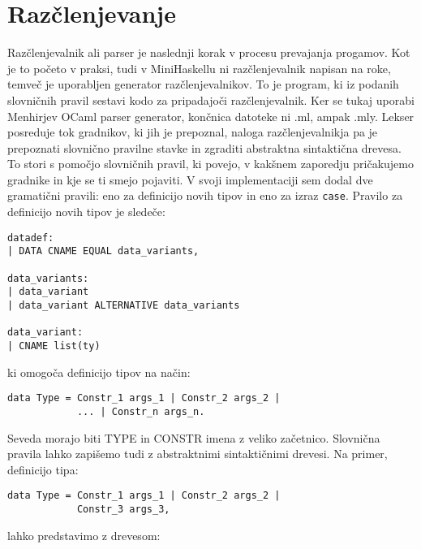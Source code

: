 \documentclass[12pt,a4paper,openany]{book}
\begin{document}
\section{Razčlenjevanje}
Razčlenjevalnik ali parser je naslednji korak v procesu prevajanja progamov. Kot je to početo v praksi, tudi v MiniHaskellu ni razčlenjevalnik napisan na roke, temveč 
je uporabljen generator razčlenjevalnikov. To je program, ki iz podanih slovničnih pravil sestavi kodo za pripadajoči razčlenjevalnik. Ker se tukaj uporabi Menhirjev OCaml parser generator, končnica 
datoteke ni .ml, ampak .mly. Lekser posreduje tok gradnikov, ki jih je prepoznal, naloga razčlenjevalnikja pa je prepoznati slovnično pravilne stavke in zgraditi 
abstraktna sintaktična drevesa. To stori s pomočjo slovničnih pravil, ki povejo, v kakšnem zaporedju pričakujemo gradnike in kje se ti smejo pojaviti. 
V svoji implementaciji sem dodal dve gramatični pravili: eno za definicijo novih tipov in eno za izraz \lstinline{case}. Pravilo za definicijo novih tipov je 
sledeče:
\begin{lstlisting}
datadef:
| DATA CNAME EQUAL data_variants,

data_variants:
| data_variant
| data_variant ALTERNATIVE data_variants

data_variant:
| CNAME list(ty)
\end{lstlisting}
ki omogoča definicijo tipov na način:
\begin{lstlisting}
data Type = Constr_1 args_1 | Constr_2 args_2 | 
            ... | Constr_n args_n.
\end{lstlisting}
Seveda morajo biti TYPE in CONSTR imena z veliko začetnico. Slovnična pravila lahko zapišemo tudi z abstraktnimi sintaktičnimi drevesi. Na primer, 
definicijo tipa:
\begin{lstlisting}
data Type = Constr_1 args_1 | Constr_2 args_2 | 
            Constr_3 args_3,
\end{lstlisting}
lahko predstavimo z drevesom:
\begin{center}
\end{center}
\end{document}
